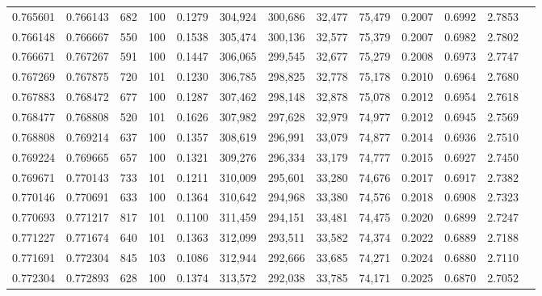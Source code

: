 \begin{tabular}{rrrrrrrrrrrrr}
0.765601 & 0.766143 &   682 & 100 &                                     0.1279 & 304,924 & 300,686 &  32,477 &  75,479 & 0.2007 & 0.6992 & 2.7853 \\
0.766148 & 0.766667 &   550 & 100 &                                     0.1538 & 305,474 & 300,136 &  32,577 &  75,379 & 0.2007 & 0.6982 & 2.7802 \\
0.766671 & 0.767267 &   591 & 100 &                                     0.1447 & 306,065 & 299,545 &  32,677 &  75,279 & 0.2008 & 0.6973 & 2.7747 \\
0.767269 & 0.767875 &   720 & 101 &                                     0.1230 & 306,785 & 298,825 &  32,778 &  75,178 & 0.2010 & 0.6964 & 2.7680 \\
0.767883 & 0.768472 &   677 & 100 &                                     0.1287 & 307,462 & 298,148 &  32,878 &  75,078 & 0.2012 & 0.6954 & 2.7618 \\
0.768477 & 0.768808 &   520 & 101 &                                     0.1626 & 307,982 & 297,628 &  32,979 &  74,977 & 0.2012 & 0.6945 & 2.7569 \\
0.768808 & 0.769214 &   637 & 100 &                                     0.1357 & 308,619 & 296,991 &  33,079 &  74,877 & 0.2014 & 0.6936 & 2.7510 \\
0.769224 & 0.769665 &   657 & 100 &                                     0.1321 & 309,276 & 296,334 &  33,179 &  74,777 & 0.2015 & 0.6927 & 2.7450 \\
0.769671 & 0.770143 &   733 & 101 &                                     0.1211 & 310,009 & 295,601 &  33,280 &  74,676 & 0.2017 & 0.6917 & 2.7382 \\
0.770146 & 0.770691 &   633 & 100 &                                     0.1364 & 310,642 & 294,968 &  33,380 &  74,576 & 0.2018 & 0.6908 & 2.7323 \\
0.770693 & 0.771217 &   817 & 101 &                                     0.1100 & 311,459 & 294,151 &  33,481 &  74,475 & 0.2020 & 0.6899 & 2.7247 \\
0.771227 & 0.771674 &   640 & 101 &                                     0.1363 & 312,099 & 293,511 &  33,582 &  74,374 & 0.2022 & 0.6889 & 2.7188 \\
0.771691 & 0.772304 &   845 & 103 &                                     0.1086 & 312,944 & 292,666 &  33,685 &  74,271 & 0.2024 & 0.6880 & 2.7110 \\
0.772304 & 0.772893 &   628 & 100 &                                     0.1374 & 313,572 & 292,038 &  33,785 &  74,171 & 0.2025 & 0.6870 & 2.7052 \\

\end{tabular}

